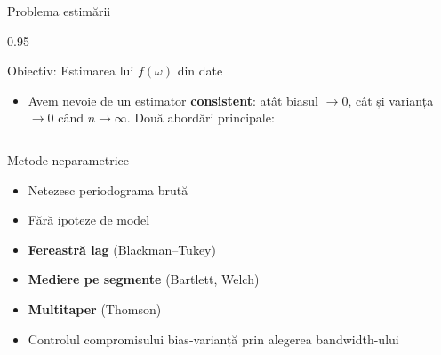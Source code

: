 \documentclass[9pt, aspectratio=169, t]{beamer}
\begin{document}
\begin{frame}{Problema estimării}
    \begin{cminipage}{0.95\textwidth}
    \vspace{-2mm}
    \begin{block}{Obiectiv: Estimarea lui $f(\omega)$ din date}
        \begin{itemize}\setlength{\itemsep}{0pt}
            \item Avem nevoie de un estimator \textbf{consistent}: atât biasul $\to 0$, cât și varianța $\to 0$ când $n \to \infty$. Două abordări principale:
        \end{itemize}
    \end{block}
    \vspace{-2mm}
    \begin{columns}[T]
        \begin{block}{Metode neparametrice}
            \begin{itemize}\setlength{\itemsep}{-2pt}
                \item Netezesc periodograma brută
                \item Fără ipoteze de model
                \item \textbf{Fereastră lag} (Blackman--Tukey)
                \item \textbf{Mediere pe segmente} (Bartlett, Welch)
                \item \textbf{Multitaper} (Thomson)
                \item Controlul compromisului bias-varianță prin alegerea bandwidth-ului
            \end{itemize}
        \end{block}


\end{columns}
\end{cminipage}
\end{frame}
\end{document}

